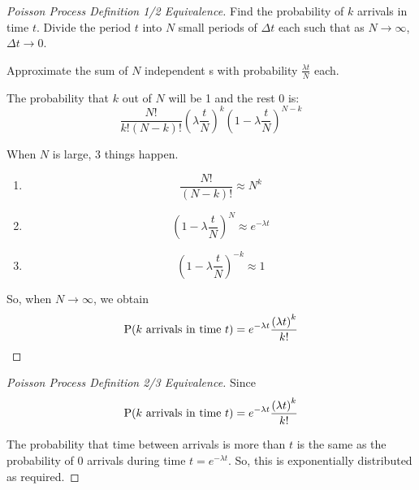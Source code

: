 \begin{proof}[Poisson Process Definition 1/2 Equivalence]\label{proof:Poisson_Process_Defn_1-2}
  Find the probability of $k$ arrivals in time $t$.
  Divide the period $t$ into $N$ small periods of $\Delta t$ each such that as $N \to \infty$, $\Delta t \to 0$.

  Approximate the sum of $N$ independent s with probability $\frac{\lambda t}{N}$ each.

  The probability that $k$ out of $N$ will be 1 and the rest 0 is:
  \begin{equation*}
    \frac{N!}{k! (N-k)!} {\left( \lambda \frac{t}{N} \right)}^{k} {\left( 1 - \lambda \frac{t}{N} \right)}^{N-k}
  \end{equation*}

  When $N$ is large, 3 things happen.
  \begin{enumerate}[noitemsep]
  \item \begin{equation}
      \frac{N!}{(N-k)!} \approx N^{k}
    \end{equation}
  \item \begin{equation}
      {\left( 1 - \lambda \frac{t}{N} \right)}^{N} \approx e^{-\lambda t}
    \end{equation}
  \item \begin{equation}
      {\left( 1 - \lambda \frac{t}{N} \right)}^{-k} \approx 1
    \end{equation}
\end{enumerate}

  So, when $N \to \infty$, we obtain
  \begin{equation*}
    \operatorname{\operatorname{P}}(k \text{ arrivals in time } t) = e^{-\lambda t} \frac{{(\lambda t)}^{k}}{k!}
  \end{equation*}
\end{proof}

\begin{proof}[Poisson Process Definition 2/3 Equivalence]\label{proof:Poisson_Process_Defn_2-3}
  Since
  \begin{equation*}
    \operatorname{\operatorname{P}}(k \text{ arrivals in time } t) = e^{-\lambda t} \frac{{(\lambda t)}^{k}}{k!}
  \end{equation*}

  The probability that time between arrivals is more than $t$ is the same as the probability of 0 arrivals during time $t = e^{-\lambda t}$.
  So, this is exponentially distributed as required.
\end{proof}

